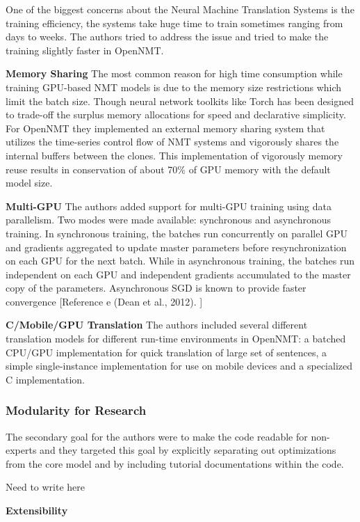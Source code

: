 One of the biggest concerns about the Neural Machine Translation Systems is the training efficiency, the systems take huge time to train sometimes ranging from days to weeks. The authors tried to address the issue and tried to make the training slightly faster in OpenNMT. 

\textbf{Memory Sharing} The most common reason for high time consumption while training GPU-based NMT models is due to the memory size restrictions which limit the batch size. Though neural network toolkits like Torch has been designed to trade-off the surplus memory allocations for speed and declarative simplicity. For OpenNMT they implemented an external memory sharing system that utilizes the time-series control flow of NMT systems and vigorously shares the internal buffers between the clones. This implementation of vigorously memory reuse results in conservation of about 70\% of GPU memory with the default model size.

\textbf{Multi-GPU} The authors added support for multi-GPU training using data parallelism. Two modes were made available: synchronous and asynchronous training. In synchronous training, the batches run concurrently on parallel GPU and gradients aggregated to update master parameters before resynchronization on each GPU for the next batch. While in asynchronous training, the batches run independent on each GPU and independent gradients accumulated to the master copy of the parameters. Asynchronous SGD is known to provide faster convergence [Reference e (Dean et al., 2012). ] 

\textbf{C/Mobile/GPU Translation} The authors included several different translation models for different run-time environments in OpenNMT: a batched CPU/GPU implementation for quick translation of large set of sentences, a simple single-instance implementation for use on mobile devices and a specialized C implementation. 

\subsubsection{Modularity for Research}

The secondary goal for the authors were to make the code readable for non-experts and they targeted this goal by explicitly separating out optimizations from the core model and by including tutorial documentations within the code. 

Need to write here 

\textbf{Extensibility}

